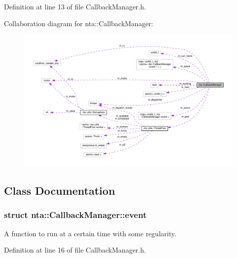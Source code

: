 Definition at line 13 of file Callback\+Manager.\+h.



Collaboration diagram for nta\+:\+:Callback\+Manager\+:\nopagebreak
\begin{figure}[H]
\begin{center}
\leavevmode
\includegraphics[width=350pt]{dc/df2/classnta_1_1CallbackManager__coll__graph}
\end{center}
\end{figure}


\subsection{Class Documentation}
\label{structnta_1_1CallbackManager_1_1event}
\subsubsection{struct nta\+:\+:Callback\+Manager\+:\+:event}
A function to run at a certain time with some regularity. 

Definition at line 16 of file Callback\+Manager.\+h.



